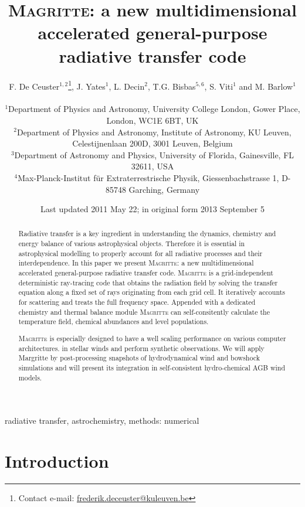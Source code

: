 \documentclass[a4paper,fleqn,usenatbib]{mnras}
\title[Magritte]{\textsc{Magritte}: a new multidimensional accelerated general-purpose radiative transfer code}
\author[F. De Ceuster et al.]{
F. De Ceuster$^{1,2}$\thanks{Contact e-mail: \href{frederik.deceuster@kuleuven.be}{frederik.deceuster@kuleuven.be}},
J. Yates$^{1}$,
L. Decin$^{2}$,
T.G. Bisbas$^{5,6}$,
S. Viti$^{1}$ and
M. Barlow$^{1}$
\\ \\
$^{1}$Department of Physics and Astronomy, University College London, Gower Place, London, WC1E 6BT, UK \\
$^{2}$Department of Physics and Astronomy, Institute of Astronomy, KU Leuven, Celestijnenlaan 200D, 3001 Leuven, Belgium \\
$^{3}$Department of Astronomy and Physics, University of Florida, Gainesville, FL 32611, USA \\
$^{4}$Max-Planck-Institut f\"ur Extraterrestrische Physik, Giessenbachstrasse 1, D-85748 Garching, Germany}
\date{Last updated 2011 May 22; in original form 2013 September 5}
\begin{document}
\label{firstpage}
\pagerange{\pageref{firstpage}--\pageref{lastpage}}
\maketitle

\begin{abstract}
	Radiative transfer is a key ingredient in understanding the dynamics, chemistry and energy balance of various astrophysical objects. Therefore it is essential in astrophysical modelling to properly account for all radiative processes and their interdependence. In this paper we present \textsc{Magritte}: a new multidimensional accelerated general-purpose radiative transfer code. \textsc{Magritte} is a grid-independent deterministic ray-tracing code that obtains the radiation field by solving the transfer equation along a fixed set of rays originating from each grid cell. It iteratively accounts for scattering and treats the full frequency space. Appended with a dedicated chemistry and thermal balance module \textsc{Magritte} can self-consitently calculate the temperature field, chemical abundances and level populations.

	\textsc{Magritte} is especially designed to have a well scaling performance on various computer architectures.   in stellar winds and perform synthetic observations. We will apply {\sc Margritte} by post-processing snapshots of hydrodynamical wind and bowshock simulations and will present its integration in self-consistent hydro-chemical AGB wind models.
\end{abstract}

\begin{keywords}
radiative transfer, astrochemistry, methods: numerical
\end{keywords}




\section{Introduction}
\end{document}
